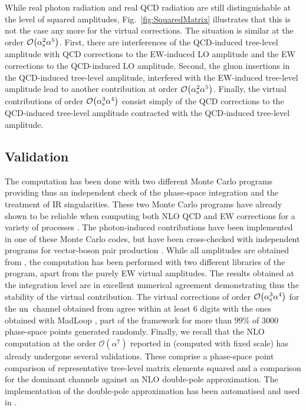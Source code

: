 \documentclass[a4article,11pt]{article}
\begin{document}
While real photon radiation and real QCD radiation are still distinguishable at the level of squared amplitudes, Fig.~\ref{fig:SquaredMatrix} illustrates that
this is not the case any more for the virtual corrections.
%
The situation is similar at the order $\mathcal{O}{\left(\alpha_{\rm s}^{2}\alpha^{5}\right)}$.
First, there are interferences of the
QCD-induced tree-level amplitude with QCD corrections to the
EW-induced LO amplitude and the EW corrections to the QCD-induced LO
amplitude.  Second, the gluon insertions in the QCD-induced tree-level
amplitude, interfered with the EW-induced tree-level amplitude lead to
another contribution at order $\mathcal{O}{\left(\alpha_{\rm s}^{2}\alpha^{5}\right)}$.
%
Finally, the virtual contributions of order
$\mathcal{O}{\left(\alpha_\text{s}^{3}\alpha^{4}\right)}$ consist
simply of the QCD corrections to the QCD-induced tree-level amplitude
contracted with the QCD-induced tree-level amplitude.


\subsection{Validation}
\label{sec:Validations}

The computation has been done with two different Monte Carlo programs
providing thus an independent check of
the phase-space integration and the treatment of IR singularities.
These two Monte Carlo programs have already shown to be reliable when
computing both NLO QCD and EW corrections for a variety of processes
\cite{Denner:2015yca,Biedermann:2016yvs,Biedermann:2016guo,Biedermann:2016yds,Biedermann:2016lvg,Denner:2016jyo,Denner:2016wet}.
The photon-induced contributions have been implemented in one of these
Monte Carlo codes, but have been cross-checked with independent
programs for vector-boson pair production
\cite{Biedermann:2016guo,Biedermann:2016lvg}.  While all amplitudes
are obtained from \recola, the computation has been performed with two
different libraries of the
\collier~\cite{Denner:2014gla,Denner:2016kdg} program, apart from the
purely EW virtual amplitudes.  The results obtained at the integration
level are in excellent numerical agreement demonstrating thus the
stability of the virtual contribution.  The virtual corrections of
order $\mathcal{O}{\left(\alpha_\text{s}^{3}\alpha^{4}\right)}$ for the
$\text{u}\text{u}$~channel obtained from \recola agree within at least 6 digits
with the ones obtained with {\sc MadLoop} \cite{Hirschi:2011pa}, part
of the \madgraph \cite{Alwall:2014hca} framework for more than $99\%$
of 3000 phase-space points generated randomly.  Finally, we recall
that the NLO computation at the order
$\mathcal{O}{\left(\alpha^{7}\right)}$ reported in
 (computed with fixed scale) has already
undergone several validations.
These comprise a phase-space point comparison of representative
tree-level matrix elements squared and a comparison for the dominant
channels against an NLO double-pole approximation.  The implementation
of the double-pole approximation has been automatised and used in
.
\end{document}
